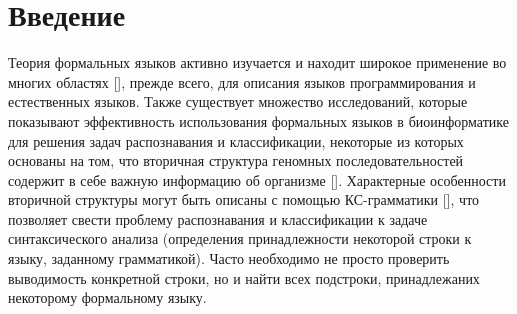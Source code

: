 \documentclass[14pt]{matmex-diploma-custom}
\begin{document}
\makeatletter
\let\@upn\textbf%
\makeatother
\newtheorem{theorem}{Теорема}
\newtheorem{lemma}{Лемма}



\maketitle
\tableofcontents
\section*{Введение}

Теория формальных языков активно изучается и находит широкое применение во многих областях [], прежде всего, для описания языков программирования и естественных языков. 
Также существует множество исследований, которые показывают эффективность использования формальных языков в биоинформатике  для решения задач распознавания и классификации, некоторые из которых основаны на том, что вторичная структура геномных последовательностей содержит в себе важную информацию об организме []. 
Характерные особенности вторичной структуры могут быть описаны с помощью КС-грамматики [], что позволяет свести проблему распознавания и классификации к задаче синтаксического анализа (определения принадлежности некоторой строки к языку, заданному грамматикой). 
Часто необходимо не просто проверить выводимость конкретной строки, но и найти всех подстроки, принадлежаних некоторому формальному языку.
\end{document}
